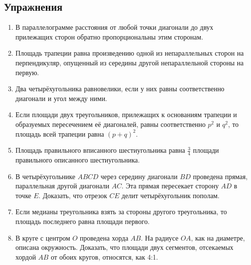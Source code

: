 \documentclass[oneside]{book}
\begin{document}
\pagebreak

\subsection*{Упражнения}

\begin{center}
\end{center}

\begin{enumerate}
 \item
В параллелограмме расстояния от любой точки диагонали до двух прилежащих сторон обратно пропорциональны этим сторонам.

 \item
Площадь трапеции равна произведению одной из непараллельных сторон на перпендикуляр, опущенный из середины другой непараллельной стороны на первую.

 \item
Два четырёхугольника равновелики, если у них равны соответственно диагонали и угол между ними.

 \item
Если площади двух треугольников, прилежащих к основаниям трапеции и образуемых пересечением её диагоналей, равны соответственно $p^2$ и $q^2$, то площадь всей трапеции равна $(p+q)^2$.

 \item
Площадь правильного вписанного шестиугольника равна $\tfrac34$ площади правильного описанного шестиугольника.

 \item
В четырёхугольнике $ABCD$ через середину диагонали $BD$ проведена прямая, параллельная другой диагонали $AC$.
Эта прямая пересекает сторону $AD$ в точке $E$.
Доказать, что отрезок $CE$ делит четырёхугольник пополам.

 \item
Если медианы треугольника взять за стороны другого треугольника, то площадь последнего равна площади первого.

 \item
В круге с центром $O$ проведена хорда $AB$.
На радиусе $OA$, как на диаметре, описана окружность.
Доказать, что площади двух сегментов, отсекаемых хордой $AB$ от обоих кругов, относятся, как 4:1.


\end{enumerate}

\begin{center}
\end{center}
\end{document}
